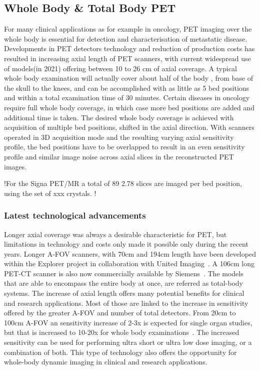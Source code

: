 \subsection{Whole Body \& Total Body PET}
For many clinical applications as for example in oncology, PET imaging over the whole body is essential for detection and characterisation of metastatic disease. Developments in PET detectors technology and reduction of production costs has resulted in increasing axial length of PET scanners, with current widespread use of models(in 2021) offering between 10 to 26 cm of axial coverage.
A typical whole body examination will actually cover about half of the body , from base of the skull to the knees, and can be accomplished with as little as 5 bed positions and within a total examination time of 30 minutes. Certain diseases in oncology require full whole body coverage, in which case more bed positions are added and additional time is taken. 
The desired whole body coverage is achieved with acquisition of multiple bed positions, shifted in the axial direction. With scanners operated in 3D acquisition mode and the resulting varying axial sensitivity profile, the bed positions have to be overlapped to result in an even sensitivity profile and similar image noise across axial slices in the reconstructed PET images. 

!For the Signa PET/MR a total of 89 2.78 slices are imaged per bed position, using the set of xxx crystals. !

\subsubsection{Latest technological advancements}
Longer axial coverage was always a desirable characteristic for PET, but limitations in technology and costs only made it possible only during the recent years. Longer A-FOV scanners, with 70cm and 194cm length have been developed within the Explorer project in collaboration with United Imaging~\cite{Cherry2017,Badawi2019}. A 106cm long PET-CT scanner is also now commercially available by Siemens~\cite{Siegel2020}.  The models that are able to encompass the entire body at once, are referred as total-body systems. 
The increase of axial length offers many potential benefits for clinical and research applications. Most of those are linked to the increase in sensitivity offered by the greater A-FOV and number of total detectors. From 20cm to 100cm A-FOV an sensitivity increase of 2-3x is expected for single organ studies, but that is increased to 10-20x for whole body examinations~\cite{Vandenberghe2020}. The increased sensitivity can be used for performing ultra short or ultra low dose imaging, or a combination of both. This type of technology also offers the opportunity for whole-body dynamic imaging in clinical and research applications. 

